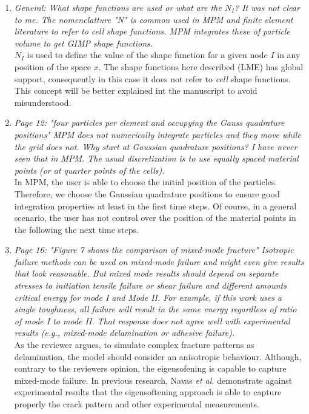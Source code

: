 \documentclass[12pt]{article}
\begin{document}
\begin{enumerate}
\item \textit{General: What shape functions are used or what are the $N_I$? It was not clear to me. The nomenclatture "N" is common used in MPM and finite element literature to refer to cell shape functions. MPM integrates these of particle volume to get GIMP shape functions.}\\

$N_I$ is used to define the value of the shape function for a given node $I$ in any position of the space $x$. The shape functions here described (LME) has global support, consequently in this case it does not refer to \textit{cell} shape functions. This concept will be better explained int the  manuscript to avoid misunderstood.
  
\item \textit{Page 12: "four particles per element and occupying the Gauss quadrature positions" MPM does not numerically integrate particles and they move while the grid does not. Why start at Gaussian quadrature positions? I have never seen that in MPM. The usual discretization is to use equally spaced material points (or at quarter points of the cells).}\\

In MPM, the user is able to choose the initial position of the particles. Therefore, we choose the Gaussian quadrature positions to ensure good integration properties at least in the first time steps. Of course, in a general scenario, the user has not control over the position of the material points in the following the next time steps. 
   
\item \textit{Page 16: "Figure 7 shows the comparison of mixed-mode fracture"
Isotropic failure methods can be used on mixed-mode failure and might even give results that look reasonable. But mixed mode results should depend on separate stresses to initiation tensile failure or shear failure and different amounts critical energy for mode I and Mode II. For example, if this work uses a single toughness, all failure will result in the same energy regardless of ratio of mode I to mode II. That response does not agree well with experimental results (e.g., mixed-mode delamination or adhesive failure).}\\

As the reviewer argues, to simulate complex fracture patterns as delamination, the model should consider an anisotropic behaviour. Although, contrary to the reviewer\textquotesingle s opinion, the eigensofening is capable to capture mixed-mode failure. In previous research, Navas {\it et al.}  \cite{Navas_2018b} demonstrate against experimental results that the eigensoftening approach is able to capture properly the crack pattern and other experimental measurements. 


\end{enumerate}
\end{document}
